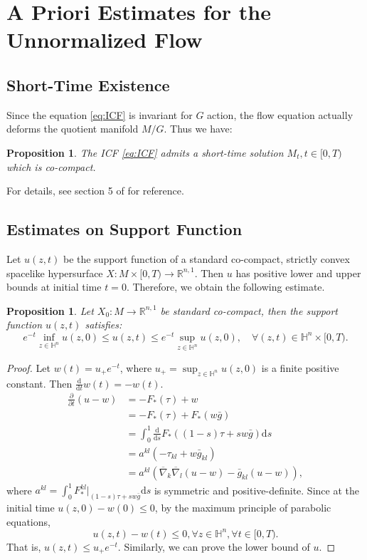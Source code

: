 \documentclass[10pt,a4paper]{amsart}
\newtheorem{proposition}[theorem]{Proposition}
\newcommand{\dd}{\ensuremath{\text{d}}}
\newcommand{\R}{\ensuremath{\mathbb{R}}}
\renewcommand{\H}{{\mathbb{H}}}
\newcommand{\pd}[2]{\frac{\partial {#1}}{\partial {#2}}}
\newcommand{\bnabla}{\overline{\nabla}}
\newcommand{\bg}{\bar{g}}
\numberwithin{equation}{section}
\begin{document}
\section{A Priori Estimates for the Unnormalized Flow}\label{sec:unnormalized-flow}

\subsection{Short-Time Existence}
Since the equation \eqref{eq:ICF} is invariant for \(G\) action, the flow equation actually deforms the quotient manifold \(M/G\). Thus we have:  

\begin{proposition}
    The ICF \eqref{eq:ICF} admits a short-time solution \(M_t, t\in [0,T)\) which is co-compact.  
\end{proposition}
For details, see section 5 of \cite{co-compact} for reference.


\subsection{Estimates on Support Function}
Let \(u(z,t)\) be the support function of a standard co-compact, strictly convex spacelike hypersurface \(X:M\times [0,T) \to\R^{n,1}\). Then \(u\) has positive lower and upper bounds at initial time \(t = 0\). Therefore, we obtain the following estimate.
\begin{proposition}\label{prop:support-estimate}
    Let \(X_0:M\to \R^{n,1}\) be standard co-compact, then the support function \(u(z,t)\) satisfies:
    \begin{equation}\label{eq:std supp func est}
        e^{-t}\inf_{z\in \H^n}u(z,0) \leq u(z,t) \leq e^{-t}\sup_{z\in \H^n}u(z,0), \quad \forall (z,t)\in \H^n \times [0,T).
    \end{equation}
\end{proposition}
\begin{proof}
    Let \(w(t) = u_+ e^{-t}\), where \(u_+ = \sup_{z\in \H^n} u(z,0)\) is a finite positive constant. Then \(\frac{\dd }{\dd t}w(t) = -w(t)\). 
    \[ \begin{aligned}
        \pd{}{t}(u - w) &= -F_*(\tau) + w \\
        &= -F_*(\tau) + F_*(w\bg) \\
        &= \int_0^1 \frac{\dd}{\dd s}F_*((1-s)\tau + sw\bg)\dd s \\
        &= a^{kl}(-\tau_{kl} + w\bg_{kl}) \\
        &= a^{kl}\left(\bnabla_k \bnabla_l(u - w)-\bg_{kl}(u - w) \right),
    \end{aligned}
    \]
    where \(a^{kl} = \int_0^1 F_*^{kl}\big|_{(1-s)\tau+ sw\bg} \dd s\) is symmetric and positive-definite. Since at the initial time \(u(z,0)-w(0)\leq 0\), by the maximum principle of parabolic equations, 
    \[ u(z,t) - w(t) \leq 0, \forall z\in \H^n, \forall t\in[0,T).\] 
    That is, \(u(z,t)\leq u_+ e^{-t}\). Similarly, we can prove the lower bound of $u$.
    \end{proof}
\end{document}
